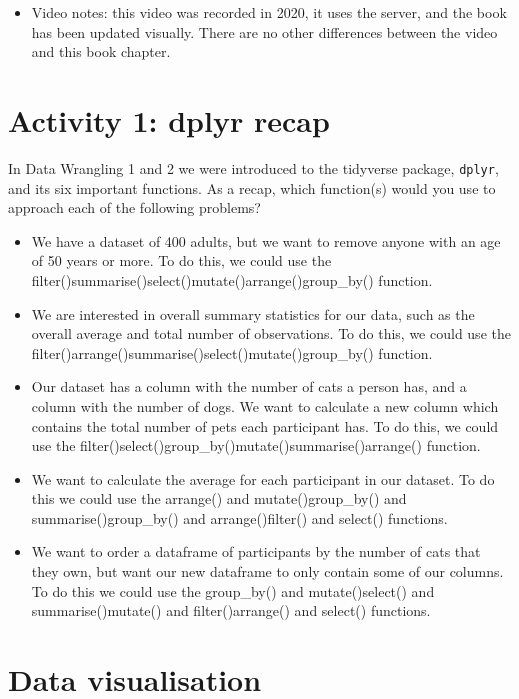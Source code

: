 \documentclass[
  oneside]{book}
\providecommand{\tightlist}{%
  \setlength{\itemsep}{0pt}\setlength{\parskip}{0pt}}
\begin{document}
\begin{itemize}
\tightlist
\item
  Video notes: this video was recorded in 2020, it uses the server, and the book has been updated visually. There are no other differences between the video and this book chapter.
\end{itemize}

\hypertarget{activity-1-dplyr-recap}{%
\section{Activity 1: dplyr recap}\label{activity-1-dplyr-recap}}

In Data Wrangling 1 and 2 we were introduced to the tidyverse package, \texttt{dplyr}, and its six important functions. As a recap, which function(s) would you use to approach each of the following problems?

\begin{itemize}
\item
  We have a dataset of 400 adults, but we want to remove anyone with an age of 50 years or more. To do this, we could use the filter()summarise()select()mutate()arrange()group\_by() function.
\item
  We are interested in overall summary statistics for our data, such as the overall average and total number of observations. To do this, we could use the filter()arrange()summarise()select()mutate()group\_by() function.
\item
  Our dataset has a column with the number of cats a person has, and a column with the number of dogs. We want to calculate a new column which contains the total number of pets each participant has. To do this, we could use the filter()select()group\_by()mutate()summarise()arrange() function.
\item
  We want to calculate the average for each participant in our dataset. To do this we could use the arrange() and mutate()group\_by() and summarise()group\_by() and arrange()filter() and select() functions.
\item
  We want to order a dataframe of participants by the number of cats that they own, but want our new dataframe to only contain some of our columns. To do this we could use the group\_by() and mutate()select() and summarise()mutate() and filter()arrange() and select() functions.
\end{itemize}

\hypertarget{data-visualisation}{%
\section{Data visualisation}\label{data-visualisation}}
\end{document}

